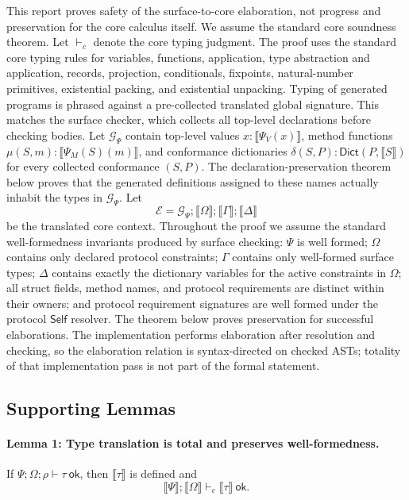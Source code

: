 \documentclass[manuscript,nonacm]{acmart}
\newcommand{\kw}[1]{\ensuremath{\mathsf{#1}}}
\newcommand{\Self}{\kw{Self}\xspace}
\newcommand{\ok}{\ \kw{ok}}
\newcommand{\has}{\vdash}
\newcommand{\trans}[1]{\llbracket #1 \rrbracket}
\newcommand{\Dict}{\mathsf{Dict}}
\begin{document}
This report proves safety of the surface-to-core elaboration, not progress and preservation for the core calculus itself.
We assume the standard core soundness theorem.
Let $\has_c$ denote the core typing judgment.
The proof uses the standard core typing rules for variables, functions, application, type abstraction and application, records, projection, conditionals, fixpoints, natural-number primitives, existential packing, and existential unpacking.
Typing of generated programs is phrased against a pre-collected translated global signature.
This matches the surface checker, which collects all top-level declarations before checking bodies.
Let $\mathcal{G}_\Psi$ contain top-level values $x:\trans{\Psi_V(x)}$, method functions $\mu(S,m):\trans{\Psi_M(S)(m)}$, and conformance dictionaries $\delta(S,P):\Dict(P,\trans{S})$ for every collected conformance $(S,P)$.
The declaration-preservation theorem below proves that the generated definitions assigned to these names actually inhabit the types in $\mathcal{G}_\Psi$.
Let
\[
  \mathcal{E}
  =
  \mathcal{G}_\Psi;\trans{\Omega};\trans{\Gamma};\trans{\Delta}
\]
be the translated core context.
Throughout the proof we assume the standard well-formedness invariants produced by surface checking:
$\Psi$ is well formed; $\Omega$ contains only declared protocol constraints; $\Gamma$ contains only well-formed surface types; $\Delta$ contains exactly the dictionary variables for the active constraints in $\Omega$; all struct fields, method names, and protocol requirements are distinct within their owners; and protocol requirement signatures are well formed under the protocol \Self resolver.
The theorem below proves preservation for successful elaborations.
The implementation performs elaboration after resolution and checking, so the elaboration relation is syntax-directed on checked ASTs; totality of that implementation pass is not part of the formal statement.

\subsection{Supporting Lemmas}

\paragraph{Lemma 1: Type translation is total and preserves well-formedness.}
If $\Psi;\Omega;\rho\has\tau\ok$, then $\trans{\tau}$ is defined and
\[
  \trans{\Psi};\trans{\Omega}\has_c\trans{\tau}\ok.
\]
\end{document}

